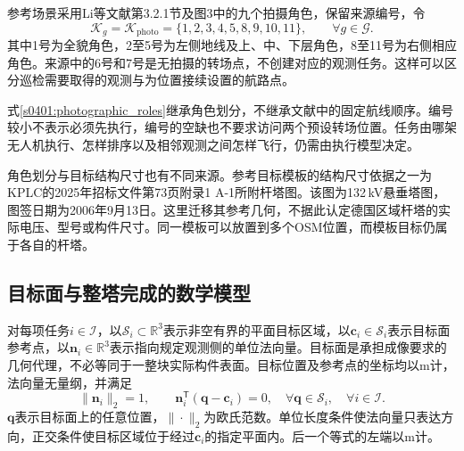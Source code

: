 参考场景采用Li等文献第3.2.1节及图3中的九个拍摄角色\cite{LiInspection2023}，保留来源编号，令
\begin{equation}
 \mathcal K_g=\mathcal K_{\mathrm{photo}}
 =\{1,2,3,4,5,8,9,10,11\},
 \qquad \forall g\in\mathcal G.
 \label{s0401:photographic_roles}
\end{equation}
其中1号为全貌角色，2至5号为左侧地线及上、中、下层角色，8至11号为右侧相应角色。来源中的6号和7号是无拍摄的转场点，不创建对应的观测任务。这样可以区分巡检需要取得的观测与为位置接续设置的航路点。

式\eqref{s0401:photographic_roles}继承角色划分，不继承文献中的固定航线顺序。编号较小不表示必须先执行，编号的空缺也不要求访问两个预设转场位置。任务由哪架无人机执行、怎样排序以及相邻观测之间怎样飞行，仍需由执行模型决定。

角色划分与目标结构尺寸也有不同来源。参考目标模板的结构尺寸依据之一为KPLC的2025年招标文件第73页附录1 A-1所附杆塔图\cite{KPLC2025}。该图为132\,kV悬垂塔图，图签日期为2006年9月13日。这里迁移其参考几何，不据此认定德国区域杆塔的实际电压、型号或构件尺寸。同一模板可以放置到多个OSM位置，而模板目标仍属于各自的杆塔。

\subsection{目标面与整塔完成的数学模型}

对每项任务$i\in\mathcal I$，以$\mathcal S_i\subset\mathbb R^3$表示非空有界的平面目标区域，以$\mathbf c_i\in\mathcal S_i$表示目标面参考点，以$\mathbf n_i\in\mathbb R^3$表示指向规定观测侧的单位法向量。目标面是承担成像要求的几何代理，不必等同于一整块实际构件表面。目标位置及参考点的坐标均以$\mathrm m$计，法向量无量纲，并满足
\begin{equation}
 \|\mathbf n_i\|_2=1,
 \qquad
 \mathbf n_i^{\mathsf T}(\mathbf q-\mathbf c_i)=0,
 \quad \forall\mathbf q\in\mathcal S_i,
 \quad \forall i\in\mathcal I.
 \label{s0401:target_plane}
\end{equation}
$\mathbf q$表示目标面上的任意位置，$\|\cdot\|_2$为欧氏范数。单位长度条件使法向量只表达方向，正交条件使目标区域位于经过$\mathbf c_i$的指定平面内。后一个等式的左端以$\mathrm m$计。

